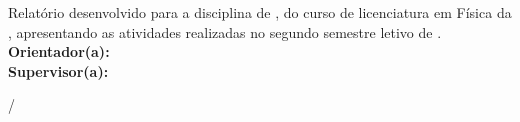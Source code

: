 \begin{center}	
	\textsc{\titulo}
\end{center}

\vspace{2cm}	

\begin{center}
	\autor
\end{center}

\vspace{2.5cm}

\hfill \parbox{8.5cm}{\noindent
Relatório desenvolvido para a disciplina de \disciplina , do curso de licenciatura em Física da \instituicao, apresentando as atividades realizadas no segundo semestre letivo de \ano.\vspace{.5cm}\\
\textbf{Orientador(a):} \orientador \\
\textbf{Supervisor(a):} \coorientador}
\vfill

\vspace{2.0cm}

\begin{center}
\cidade/\estado

\mes \ano
\end{center}

\newpage